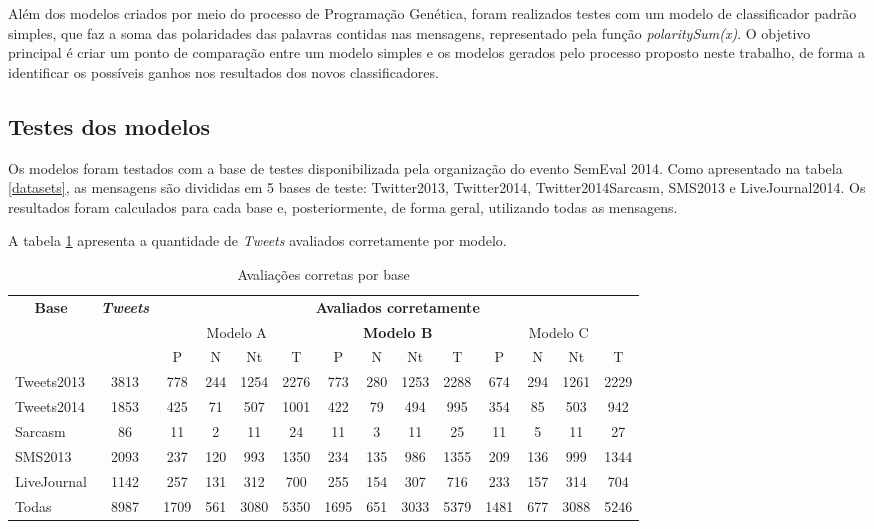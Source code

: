\documentclass[12pt]{article}
\begin{document}
Além dos modelos criados por meio do processo de Programação Genética, foram realizados testes com um modelo de classificador padrão simples, que faz a soma das polaridades das palavras contidas nas mensagens, representado pela função \emph{polaritySum(x)}. O objetivo principal é criar um ponto de comparação entre um modelo simples e os modelos gerados pelo processo proposto neste trabalho, de forma a identificar os possíveis ganhos nos resultados dos novos classificadores.

\subsection{Testes dos modelos}

Os modelos foram testados com a base de testes disponibilizada pela organização do evento SemEval 2014. Como apresentado na tabela \ref{datasets}, as mensagens são divididas em 5 bases de teste: Twitter2013, Twitter2014, Twitter2014Sarcasm, SMS2013 e LiveJournal2014. Os resultados foram calculados para cada base e, posteriormente, de forma geral, utilizando todas as mensagens.

A tabela \ref{correctEvaluations} apresenta a quantidade de \emph{Tweets} avaliados corretamente por modelo. 

\begin{table}[H]
\centering
\begin{adjustwidth}{-1.5cm}{}
\begin{tabular}{lccccccccccccc}
\multicolumn{1}{c}{\textbf{Base}} & \textit{\textbf{Tweets}} & \multicolumn{12}{c}{\textbf{Avaliados corretamente}} \\
 & \multicolumn{1}{l}{} & \multicolumn{4}{c}{Modelo A} & \multicolumn{4}{c}{\textbf{Modelo B}} & \multicolumn{4}{c}{Modelo C} \\
 & \multicolumn{1}{l}{} & \multicolumn{1}{c|}{P} & \multicolumn{1}{c|}{N} & \multicolumn{1}{c|}{Nt} & T & \multicolumn{1}{c|}{P} & \multicolumn{1}{c|}{N} & \multicolumn{1}{c|}{Nt} & T & \multicolumn{1}{c|}{P} & \multicolumn{1}{c|}{N} & \multicolumn{1}{c|}{Nt} & T \\
Tweets2013 & 3813 & 778 & 244 & 1254 & 2276 & 773 & 280 & 1253 & 2288 & 674 & 294 & 1261 & 2229 \\ \hline
Tweets2014 & 1853 & 425 & 71 & 507 & 1001 & 422 & 79 & 494 & 995 & 354 & 85 & 503 & 942 \\ \hline
Sarcasm & 86 & 11 & 2 & 11 & 24 & 11 & 3 & 11 & 25 & 11 & 5 & 11 & 27 \\ \hline
SMS2013 & 2093 & 237 & 120 & 993 & 1350 & 234 & 135 & 986 & 1355 & 209 & 136 & 999 & 1344 \\ \hline
LiveJournal & 1142 & 257 & 131 & 312 & 700 & 255 & 154 & 307 & 716 & 233 & 157 & 314 & 704 \\ \hline
Todas & 8987 & 1709 & 561 & 3080 & 5350 & 1695 & 651 & 3033 & 5379 & 1481 & 677 & 3088 & 5246\\ \hline
\end{tabular}
\caption{Avaliações corretas por base}
\label{correctEvaluations}
\end{adjustwidth}
\end{table}
\end{document}
